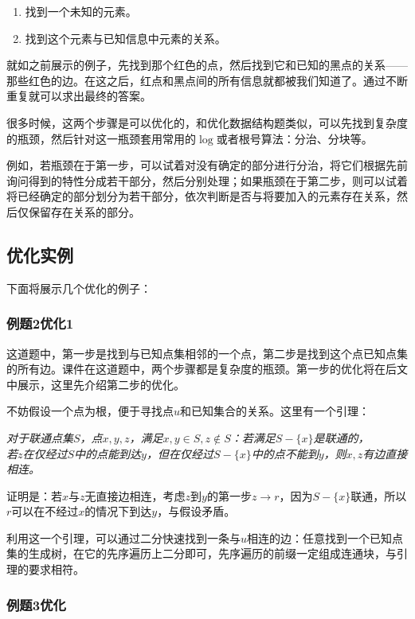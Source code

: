 \documentclass{noithesis}
\begin{document}
\begin{enumerate}
	\item 找到一个未知的元素。
	\item 找到这个元素与已知信息中元素的关系。
\end{enumerate}

就如之前展示的例子，先找到那个红色的点，然后找到它和已知的黑点的关系——那些红色的边。在这之后，红点和黑点间的所有信息就都被我们知道了。通过不断重复就可以求出最终的答案。

很多时候，这两个步骤是可以优化的，和优化数据结构题类似，可以先找到复杂度的瓶颈，然后针对这一瓶颈套用常用的$\log$或者根号算法：分治、分块等。

例如，若瓶颈在于第一步，可以试着对没有确定的部分进行分治，将它们根据先前询问得到的特性分成若干部分，然后分别处理；如果瓶颈在于第二步，则可以试着将已经确定的部分划分为若干部分，依次判断是否与将要加入的元素存在关系，然后仅保留存在关系的部分。

\subsection{优化实例}

下面将展示几个优化的例子：

\subsubsection{例题2优化1}

这道题中，第一步是找到与已知点集相邻的一个点，第二步是找到这个点已知点集的所有边。课件在这道题中，两个步骤都是复杂度的瓶颈。第一步的优化将在后文中展示，这里先介绍第二步的优化。

不妨假设一个点为根，便于寻找点$u$和已知集合的关系。这里有一个引理：

\emph{对于联通点集$S$，点$x,y,z$，满足$x,y\in S,z\not\in S$：若满足$S-\{x\}$是联通的，\\若$z$在仅经过$S$中的点能到达$y$，但在仅经过$S-\{x\}$中的点不能到$y$，则$x,z$有边直接相连。}

证明是：若$x$与$z$无直接边相连，考虑$z$到$y$的第一步$z\rightarrow r$，因为$S-\{x\}$联通，所以$r$可以在不经过$x$的情况下到达$y$，与假设矛盾。

利用这一个引理，可以通过二分快速找到一条与$u$相连的边：任意找到一个已知点集的生成树，在它的先序遍历上二分即可，先序遍历的前缀一定组成连通块，与引理的要求相符。

\subsubsection{例题3优化}
\end{document}
